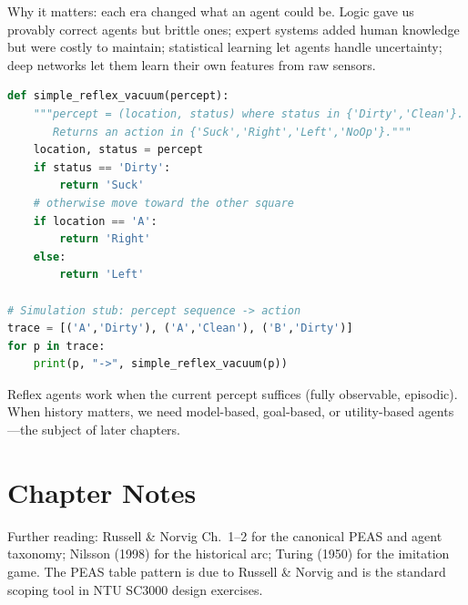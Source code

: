 Why it matters: each era changed what an agent could be. Logic gave us provably correct agents but brittle ones; expert systems added human knowledge but were costly to maintain; statistical learning let agents handle uncertainty; deep networks let them learn their own features from raw sensors.

\begin{lstlisting}[language=Python, caption={A simple reflex agent for the vacuum world. No memory beyond the current percept.}, label={lst:reflex}]
def simple_reflex_vacuum(percept):
    """percept = (location, status) where status in {'Dirty','Clean'}.
       Returns an action in {'Suck','Right','Left','NoOp'}."""
    location, status = percept
    if status == 'Dirty':
        return 'Suck'
    # otherwise move toward the other square
    if location == 'A':
        return 'Right'
    else:
        return 'Left'

# Simulation stub: percept sequence -> action
trace = [('A','Dirty'), ('A','Clean'), ('B','Dirty')]
for p in trace:
    print(p, "->", simple_reflex_vacuum(p))
\end{lstlisting}
Reflex agents work when the current percept suffices (fully observable, episodic). When history matters, we need model-based, goal-based, or utility-based agents---the subject of later chapters.

\section{Chapter Notes}
Further reading: Russell \& Norvig Ch.~1--2 for the canonical PEAS and agent taxonomy; Nilsson (1998) for the historical arc; Turing (1950) for the imitation game. The PEAS table pattern is due to Russell \& Norvig and is the standard scoping tool in NTU SC3000 design exercises.

